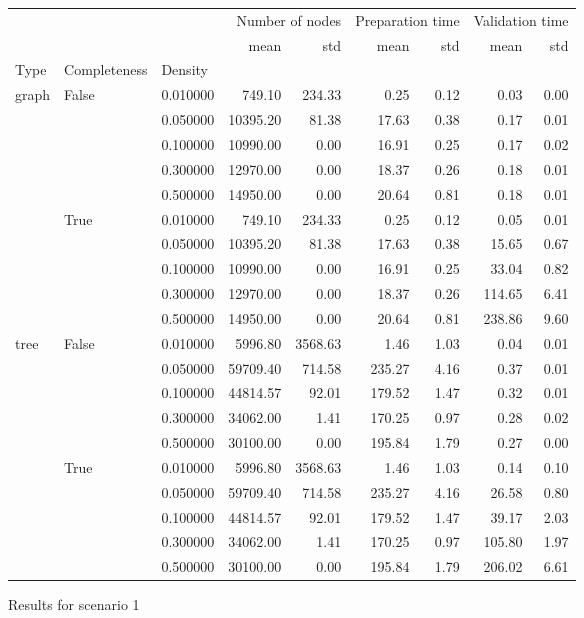 \begin{figure}
    \begin{tabular}{lllrrrrrr}
        &  &  & \multicolumn{2}{r}{Number of nodes} & \multicolumn{2}{r}{Preparation time} & \multicolumn{2}{r}{Validation time} \\
        &  &  & mean & std & mean & std & mean & std \\
       Type & Completeness & Density &  &  &  &  &  &  \\
       \multirow[c]{10}{*}{graph} & \multirow[c]{5}{*}{False} & 0.010000 & 749.10 & 234.33 & 0.25 & 0.12 & 0.03 & 0.00 \\
        &  & 0.050000 & 10395.20 & 81.38 & 17.63 & 0.38 & 0.17 & 0.01 \\
        &  & 0.100000 & 10990.00 & 0.00 & 16.91 & 0.25 & 0.17 & 0.02 \\
        &  & 0.300000 & 12970.00 & 0.00 & 18.37 & 0.26 & 0.18 & 0.01 \\
        &  & 0.500000 & 14950.00 & 0.00 & 20.64 & 0.81 & 0.18 & 0.01 \\
        & \multirow[c]{5}{*}{True} & 0.010000 & 749.10 & 234.33 & 0.25 & 0.12 & 0.05 & 0.01 \\
        &  & 0.050000 & 10395.20 & 81.38 & 17.63 & 0.38 & 15.65 & 0.67 \\
        &  & 0.100000 & 10990.00 & 0.00 & 16.91 & 0.25 & 33.04 & 0.82 \\
        &  & 0.300000 & 12970.00 & 0.00 & 18.37 & 0.26 & 114.65 & 6.41 \\
        &  & 0.500000 & 14950.00 & 0.00 & 20.64 & 0.81 & 238.86 & 9.60 \\
       \multirow[c]{10}{*}{tree} & \multirow[c]{5}{*}{False} & 0.010000 & 5996.80 & 3568.63 & 1.46 & 1.03 & 0.04 & 0.01 \\
        &  & 0.050000 & 59709.40 & 714.58 & 235.27 & 4.16 & 0.37 & 0.01 \\
        &  & 0.100000 & 44814.57 & 92.01 & 179.52 & 1.47 & 0.32 & 0.01 \\
        &  & 0.300000 & 34062.00 & 1.41 & 170.25 & 0.97 & 0.28 & 0.02 \\
        &  & 0.500000 & 30100.00 & 0.00 & 195.84 & 1.79 & 0.27 & 0.00 \\
        & \multirow[c]{5}{*}{True} & 0.010000 & 5996.80 & 3568.63 & 1.46 & 1.03 & 0.14 & 0.10 \\
        &  & 0.050000 & 59709.40 & 714.58 & 235.27 & 4.16 & 26.58 & 0.80 \\
        &  & 0.100000 & 44814.57 & 92.01 & 179.52 & 1.47 & 39.17 & 2.03 \\
        &  & 0.300000 & 34062.00 & 1.41 & 170.25 & 0.97 & 105.80 & 1.97 \\
        &  & 0.500000 & 30100.00 & 0.00 & 195.84 & 1.79 & 206.02 & 6.61 \\
       \end{tabular}
       
\caption{Results for scenario 1}       
\end{figure}

